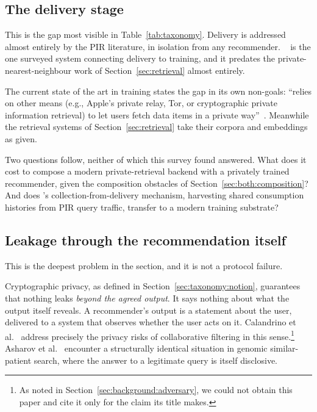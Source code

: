 \subsection{The delivery stage}
\label{sec:open:delivery}

This is the gap most visible in Table~\ref{tab:taxonomy}. Delivery is addressed almost entirely by
the PIR literature, in isolation from any recommender. \pirsonaplain{}~\cite{pirsona2021} is the
one surveyed system connecting delivery to training, and it predates the private-nearest-neighbour
work of Section~\ref{sec:retrieval} almost entirely.

The current state of the art in training states the gap in its own non-goals: \nudgeplain{}
``relies on other means (e.g., Apple's private relay, Tor, or cryptographic private information
retrieval) to let users fetch data items in a private way''~\cite{nudge2026}. Meanwhile the
retrieval systems of Section~\ref{sec:retrieval} take their corpora and embeddings as given.

Two questions follow, neither of which this survey found answered. What does it cost to compose a
modern private-retrieval backend with a privately trained recommender, given the composition
obstacles of Section~\ref{sec:both:composition}? And does \pirsonaplain{}'s
collection-from-delivery mechanism, harvesting shared consumption histories from PIR query
traffic, transfer to a modern training substrate?

\subsection{Leakage through the recommendation itself}
\label{sec:open:functionality}

This is the deepest problem in the section, and it is not a protocol failure.

Cryptographic privacy, as defined in Section~\ref{sec:taxonomy:notion}, guarantees that nothing
leaks \emph{beyond the agreed output}. It says nothing about what the output itself reveals. A
recommender's output is a statement about the user, delivered to a system that observes whether
the user acts on it. Calandrino et al.~\cite{calandrino2011} address precisely the privacy risks of
collaborative filtering in this sense.\footnote{As noted in
Section~\ref{sec:background:adversary}, we could not obtain this paper and cite it only for the
claim its title makes.} Asharov et al.~\cite{asharov2018} encounter a structurally identical
situation in genomic similar-patient search, where the answer to a legitimate query is itself
disclosive.

